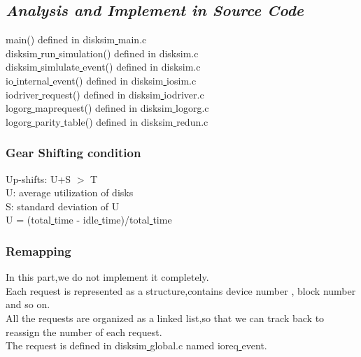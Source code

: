 \documentclass[conference]{IEEEtran}
\begin{document}
\subsection{\emph{\textbf{Analysis and Implement in Source Code}}}
\begin{flushleft}
  main() defined  in disksim\underline{ }main.c \\
  disksim\underline{ }run\underline{ }simulation() defined in disksim.c\\
  disksim\underline{ }simlulate\underline{ }event() defined in disksim.c\\
  io\underline{ }internal\underline{ }event() defined in disksim\underline{ }iosim.c\\
  iodriver\underline{ }request() defined in disksim\underline{ }iodriver.c \\
  logorg\underline{ }maprequest() defined in disksim\underline{ }logorg.c \\
  logorg\underline{ }parity\underline{ }table() defined in disksim\underline{ }redun.c\\
\subsubsection{\textbf{Gear Shifting condition}}
    \begin{flushleft}
\quad      Up-shifts: U+S $>$ T \\
\quad      U: average utilization of disks\\
\quad      S: standard deviation of U\\
\quad      U = (total\underline{ }time - idle\underline{ }time)/total\underline{ }time
    \end{flushleft}
\subsubsection{\textbf{Remapping}}
    \begin{flushleft}
\quad   In this part,we do not implement it completely.\\
\quad   Each request is represented as a structure,contains device number , block number and so on.\\
\quad   All the requests are organized as a linked list,so that we can track back to reassign the number of each request.\\
\quad   The request is defined in disksim\underline{ }global.c named ioreq\underline{ }event.\\
    \end{flushleft}
\end{flushleft}
\end{document}
